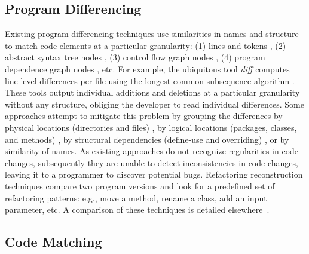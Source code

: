 \documentclass[runningheads,a4paper]{llncs}
\begin{document}
\subsection{Program Differencing} 
Existing program differencing techniques use similarities in names and structure to match code elements at a particular granularity: (1) lines and tokens \cite{Apostolico1997, Hunt1977, Reiss2008, Tichy1984}, (2) abstract syntax tree nodes \cite{Cottrell2007, Fluri2007, Hunt2002, Neamtiu2005, Raghavan2004, Yang1991}, (3) control flow graph nodes \cite{Apiwattanapong2004, Laski1992}, (4) program dependence graph nodes \cite{Binkley1995, Horwitz1990, Jackson1994}, etc.  For example, the ubiquitous tool {\it diff} computes line-level differences per file using the longest common subsequence algorithm \cite{Hunt1977}. These tools output individual additions and deletions at a particular granularity without any structure, obliging the developer to read individual differences. Some approaches attempt to mitigate this problem by grouping the differences by physical locations (directories and files) \cite{Hunt1976}, by logical locations (packages, classes, and methods) \cite{Xing2005}, by structural dependencies (define-use and overriding) \cite{Chesley2005}, or by similarity of names. 
As existing approaches do not recognize regularities in code changes, subsequently they are unable to detect inconsistencies in code changes, leaving it to a programmer to discover potential bugs.  Refactoring reconstruction techniques \cite{Antoniol2004, Dagenais2008, Demeyer2000, Dig2006, Fluri2007, Kim2007, SKim2005, Malpohl2000, Rysselberghe2003, Weissgerber2006, Xing2005, Zou2005} compare two program versions and look for a predefined set of refactoring patterns: e.g., move a method, rename a class, add an input parameter, etc. A comparison of these techniques is detailed elsewhere~\cite{Kim2008:dissertation, Sudan2010:reffinder}. 


\subsection{Code Matching} 
		\label{related_codematching}
\end{document}
